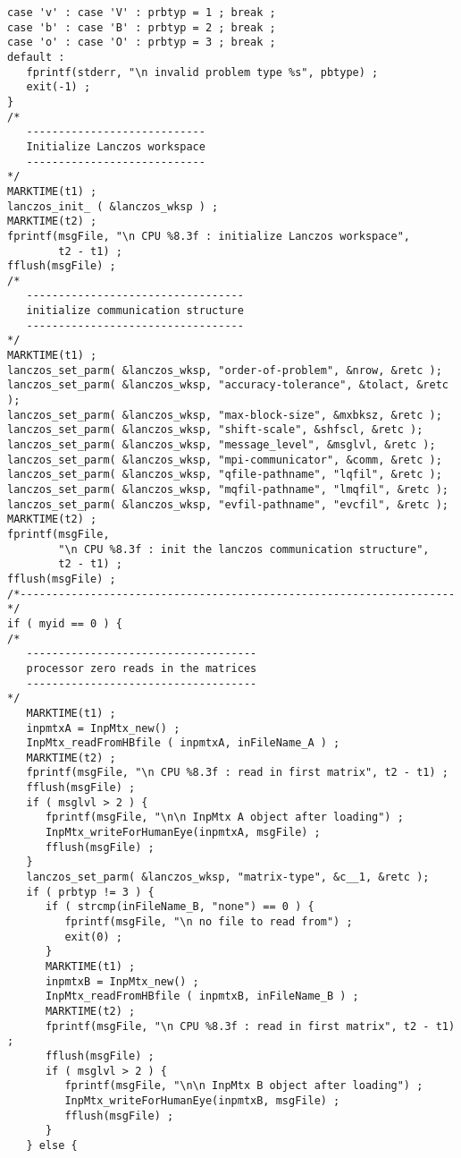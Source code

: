 \begin{verbatim}
case 'v' : case 'V' : prbtyp = 1 ; break ;
case 'b' : case 'B' : prbtyp = 2 ; break ;
case 'o' : case 'O' : prbtyp = 3 ; break ;
default :
   fprintf(stderr, "\n invalid problem type %s", pbtype) ;
   exit(-1) ;
}
/*
   ----------------------------
   Initialize Lanczos workspace
   ----------------------------
*/
MARKTIME(t1) ;
lanczos_init_ ( &lanczos_wksp ) ;
MARKTIME(t2) ;
fprintf(msgFile, "\n CPU %8.3f : initialize Lanczos workspace",
        t2 - t1) ;
fflush(msgFile) ;
/*
   ----------------------------------
   initialize communication structure
   ----------------------------------
*/
MARKTIME(t1) ;
lanczos_set_parm( &lanczos_wksp, "order-of-problem", &nrow, &retc );
lanczos_set_parm( &lanczos_wksp, "accuracy-tolerance", &tolact, &retc );
lanczos_set_parm( &lanczos_wksp, "max-block-size", &mxbksz, &retc );
lanczos_set_parm( &lanczos_wksp, "shift-scale", &shfscl, &retc );
lanczos_set_parm( &lanczos_wksp, "message_level", &msglvl, &retc );
lanczos_set_parm( &lanczos_wksp, "mpi-communicator", &comm, &retc );
lanczos_set_parm( &lanczos_wksp, "qfile-pathname", "lqfil", &retc );
lanczos_set_parm( &lanczos_wksp, "mqfil-pathname", "lmqfil", &retc );
lanczos_set_parm( &lanczos_wksp, "evfil-pathname", "evcfil", &retc );
MARKTIME(t2) ;
fprintf(msgFile, 
        "\n CPU %8.3f : init the lanczos communication structure",
        t2 - t1) ;
fflush(msgFile) ;
/*--------------------------------------------------------------------*/
if ( myid == 0 ) {
/*
   ------------------------------------
   processor zero reads in the matrices
   ------------------------------------
*/
   MARKTIME(t1) ;
   inpmtxA = InpMtx_new() ;
   InpMtx_readFromHBfile ( inpmtxA, inFileName_A ) ;
   MARKTIME(t2) ;
   fprintf(msgFile, "\n CPU %8.3f : read in first matrix", t2 - t1) ;
   fflush(msgFile) ;
   if ( msglvl > 2 ) {
      fprintf(msgFile, "\n\n InpMtx A object after loading") ;
      InpMtx_writeForHumanEye(inpmtxA, msgFile) ;
      fflush(msgFile) ;
   }
   lanczos_set_parm( &lanczos_wksp, "matrix-type", &c__1, &retc );
   if ( prbtyp != 3 ) {
      if ( strcmp(inFileName_B, "none") == 0 ) {
         fprintf(msgFile, "\n no file to read from") ;
         exit(0) ;
      }
      MARKTIME(t1) ;
      inpmtxB = InpMtx_new() ;
      InpMtx_readFromHBfile ( inpmtxB, inFileName_B ) ;
      MARKTIME(t2) ;
      fprintf(msgFile, "\n CPU %8.3f : read in first matrix", t2 - t1) ;
      fflush(msgFile) ;
      if ( msglvl > 2 ) {
         fprintf(msgFile, "\n\n InpMtx B object after loading") ;
         InpMtx_writeForHumanEye(inpmtxB, msgFile) ; 
         fflush(msgFile) ;
      }
   } else {

\end{verbatim}
